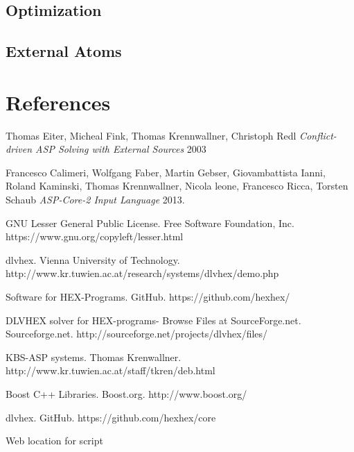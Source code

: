 \documentclass[14pt,a4paper, titlepage]{article}
\begin{document}
\subsection{Optimization}
\subsection{External Atoms}

\section{References}
\begin{thebibliography}{1}
 Thomas Eiter, Micheal Fink, Thomas Krennwallner, Christoph Redl {\em Conflict-driven ASP Solving with External Sources} 2003   
  
 Francesco Calimeri, Wolfgang Faber, Martin Gebser, Giovambattista Ianni, Roland Kaminski, Thomas Krennwallner, Nicola leone, Francesco Ricca, Torsten Schaub {\em ASP-Core-2 Input Language} 2013.

 GNU Lesser General Public License. Free Software Foundation, Inc. https://www.gnu.org/copyleft/lesser.html 

dlvhex. Vienna University of Technology. http://www.kr.tuwien.ac.at/research/systems/dlvhex/demo.php 

Software for HEX-Programs. GitHub. https://github.com/hexhex/ 

DLVHEX solver for HEX-programs-  Browse Files at SourceForge.net. Sourceforge.net. http://sourceforge.net/projects/dlvhex/files/

KBS-ASP systems. Thomas Krenwallner. http://www.kr.tuwien.ac.at/staff/tkren/deb.html

Boost C++ Libraries. Boost.org. http://www.boost.org/

dlvhex. GitHub. https://github.com/hexhex/core

Web location for script
      
 
 \end{thebibliography} 
\end{document}
